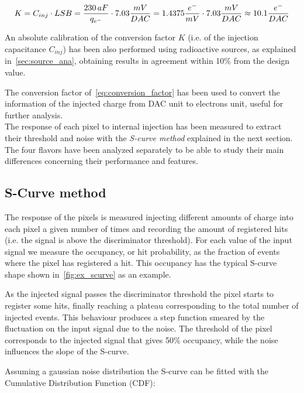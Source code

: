 \begin{equation}
\normalsize
K = C_{inj} \cdot LSB = \frac{230 \, aF}{q_{{e}^{-}}} \cdot 7.03 \frac{mV}{DAC}= 1.4375 \frac{e^{-}}{mV} \cdot 7.03 \frac{mV}{DAC} \approx 10.1 \frac{e^{-}}{DAC}  
\label{eq:conversion_factor}
\end{equation}


An absolute calibration of the conversion factor $K$ (i.e. of the injection capacitance $C_{inj}$) has been also performed using radioactive sources, as explained in~\autoref{sec:source_ana}, obtaining results in agreement within 10\% from the design value. 

The conversion factor of~\autoref{eq:conversion_factor} has been used to convert the information of the injected charge from DAC unit to electrons unit, useful for further analysis.
\\
The response of each pixel to internal injection has been measured to extract their threshold and noise with the \textit{S-curve method} explained in the next section. 
The four flavors have been analyzed separately to be able to study their main differences concerning their performance and features. 


\subsection{S-Curve method} \label{sec:threshold_subsection}

The response of the pixels is measured injecting different amounts of charge into each pixel a given number of times and recording the amount of registered hits (i.e. the signal is above the discriminator threshold). For each value of the input signal we measure the occupancy, or hit probability, as the fraction of events where the pixel has registered a hit. This occupancy has the typical S-curve shape shown in~\autoref{fig:ex_scurve} as an example. 

As the injected signal passes the discriminator threshold the pixel starts to register some hits, finally reaching a plateau corresponding to the total number of injected events. This behaviour produces a step function smeared by the fluctuation on the input signal due to the noise.  
The threshold of the pixel corresponds to the injected signal  that gives 50\% occupancy, while the noise influences the slope of the S-curve.  

Assuming a gaussian noise distribution the S-curve can be fitted with the Cumulative Distribution Function (CDF):

